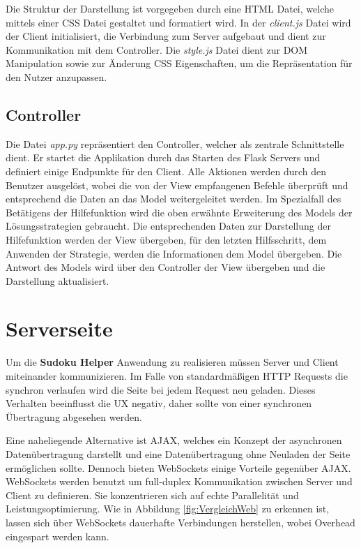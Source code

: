 Die Struktur der Darstellung ist vorgegeben durch eine \ac{HTML} Datei, welche mittels einer \ac{CSS} Datei gestaltet und formatiert wird. In der \textit{client.js} Datei wird der Client initialisiert, die Verbindung zum Server aufgebaut und dient zur Kommunikation mit dem Controller. Die \textit{style.js} Datei dient zur DOM Manipulation sowie zur Änderung \ac{CSS} Eigenschaften, um die Repräsentation für den Nutzer anzupassen.

\subsection{Controller}
Die Datei \textit{app.py} repräsentiert den Controller, welcher als zentrale Schnittstelle dient. Er startet die Applikation durch das Starten des Flask Servers und definiert einige Endpunkte für den Client. Alle Aktionen werden durch den Benutzer ausgelöst, wobei die von der View empfangenen Befehle überprüft und entsprechend die Daten an das Model weitergeleitet werden. Im Spezialfall des Betätigens der Hilfefunktion wird die oben erwähnte Erweiterung des Models der Lösungsstrategien gebraucht. Die entsprechenden Daten zur Darstellung der Hilfefunktion werden der View übergeben, für den letzten Hilfsschritt, dem Anwenden der Strategie, werden die Informationen dem Model übergeben. Die Antwort des Models wird über den Controller der View übergeben und die Darstellung aktualisiert. 

\section{Serverseite}

Um die \textbf{Sudoku Helper} Anwendung zu realisieren müssen Server und Client miteinander kommunizieren. Im Falle von standardmäßigen \ac{HTTP} Requests die synchron verlaufen wird die Seite bei jedem Request neu geladen. Dieses Verhalten beeinflusst die \ac{UX} negativ, daher sollte von einer synchronen Übertragung abgesehen werden.

Eine naheliegende Alternative ist \ac{AJAX}, welches ein Konzept der asynchronen Datenübertragung darstellt und eine Datenübertragung ohne Neuladen der Seite ermöglichen sollte. Dennoch bieten WebSockets einige Vorteile gegenüber \ac{AJAX}. WebSockets werden benutzt um full-duplex Kommunikation zwischen Server und Client zu definieren. Sie konzentrieren sich auf echte Parallelität und Leistungsoptimierung. Wie in Abbildung \ref{fig:VergleichWeb} zu erkennen ist, lassen sich über WebSockets dauerhafte Verbindungen herstellen, wobei Overhead eingespart werden kann.   

